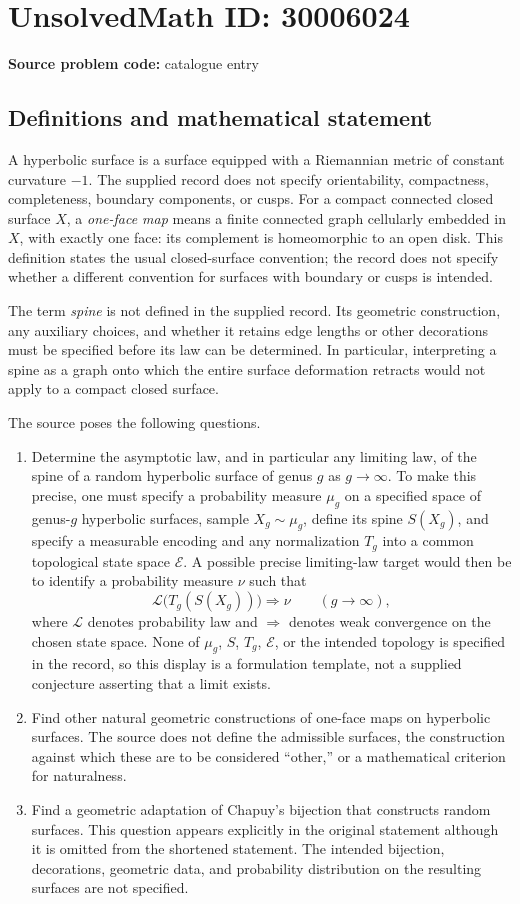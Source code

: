 \documentclass[11pt]{article}
\begin{document}
\section*{UnsolvedMath ID: 30006024}
\textbf{Source problem code:} catalogue entry
\subsection{Definitions and mathematical statement}
A hyperbolic surface is a surface equipped with a Riemannian metric of constant curvature \(-1\). The supplied record does not specify orientability, compactness, completeness, boundary components, or cusps. For a compact connected closed surface \(X\), a \emph{one-face map} means a finite connected graph cellularly embedded in \(X\), with exactly one face: its complement is homeomorphic to an open disk. This definition states the usual closed-surface convention; the record does not specify whether a different convention for surfaces with boundary or cusps is intended.

The term \emph{spine} is not defined in the supplied record. Its geometric construction, any auxiliary choices, and whether it retains edge lengths or other decorations must be specified before its law can be determined. In particular, interpreting a spine as a graph onto which the entire surface deformation retracts would not apply to a compact closed surface.

The source poses the following questions.
\begin{enumerate}
\item Determine the asymptotic law, and in particular any limiting law, of the spine of a random hyperbolic surface of genus \(g\) as \(g\to\infty\). To make this precise, one must specify a probability measure \(\mu_g\) on a specified space of genus-\(g\) hyperbolic surfaces, sample \(X_g\sim\mu_g\), define its spine \(S(X_g)\), and specify a measurable encoding and any normalization \(T_g\) into a common topological state space \(\mathcal E\). A possible precise limiting-law target would then be to identify a probability measure \(\nu\) such that
\[
\mathcal L\bigl(T_g(S(X_g))\bigr)\Longrightarrow\nu
\qquad (g\to\infty),
\]
where \(\mathcal L\) denotes probability law and \(\Longrightarrow\) denotes weak convergence on the chosen state space. None of \(\mu_g\), \(S\), \(T_g\), \(\mathcal E\), or the intended topology is specified in the record, so this display is a formulation template, not a supplied conjecture asserting that a limit exists.
\item Find other natural geometric constructions of one-face maps on hyperbolic surfaces. The source does not define the admissible surfaces, the construction against which these are to be considered ``other,'' or a mathematical criterion for naturalness.
\item Find a geometric adaptation of Chapuy's bijection that constructs random surfaces. This question appears explicitly in the original statement although it is omitted from the shortened statement. The intended bijection, decorations, geometric data, and probability distribution on the resulting surfaces are not specified.
\end{enumerate}
\end{document}
